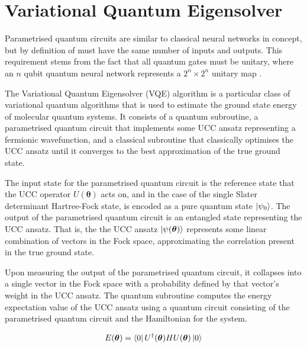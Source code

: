 \section{\label{vqe}Variational Quantum Eigensolver}

Parametrised quantum circuits are similar to classical neural networks in concept, but by definition of must have the same number of inputs and outputs. This requirement stems from the fact that all quantum gates must be unitary, where an $n$ qubit quantum neural network represents a $2^n \times 2^n$ unitary map \cite{Yeung2020}.

The Variational Quantum Eigensolver (VQE) algorithm is a particular class of variational quantum algorithms that is used to estimate the ground state energy of molecular quantum systems. It consists of a quantum subroutine, a parametrised quantum circuit that implements some UCC ansatz representing a fermionic wavefunction, and a classical subroutine that classically optimises the UCC ansatz until it converges to the best approximation of the true ground state.

The input state for the parametrised quantum circuit is the reference state that the UCC operator $U(\bm\theta)$ acts on, and in the case of the single Slater determinant Hartree-Fock state, is encoded as a pure quantum state $\ket{\psi_0}$. The output of the parametrised quantum circuit is an entangled state representing the UCC ansatz. That is, the the UCC ansatz $\ket{\psi(\bm\theta)}$ represents some linear combination of vectors in the Fock space, approximating the correlation present in the true ground state.

Upon measuring the output of the parametrised quantum circuit, it collapses into a single vector in the Fock space with a probability defined by that vector's weight in the UCC ansatz. The quantum subroutine computes the energy expectation value of the UCC ansatz using a quantum circuit consisting of the parametrised quantum circuit and  the Hamiltonian for the system.

\begin{equation*}
    E(\bm\theta) = \bra{0} U^\dagger(\bm\theta) H U(\bm\theta) \ket{0} 
\end{equation*}
